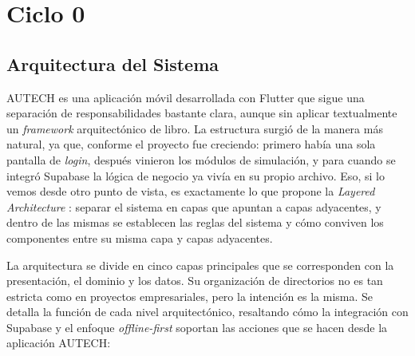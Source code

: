 
\chapter{Ciclo 0}
\label{ch:ciclo0}

\section{Arquitectura del Sistema}
\label{sec:arquitectura}

AUTECH es una aplicación móvil desarrollada con Flutter que sigue una separación de
responsabilidades bastante clara, aunque sin aplicar textualmente un \textit{framework}
arquitectónico de libro. La estructura surgió de la manera más natural, ya que, conforme el
proyecto fue creciendo: primero había una sola pantalla de \textit{login}, después vinieron los
módulos de simulación, y para cuando se integró Supabase la lógica de negocio ya vivía en su
propio archivo. Eso, si lo vemos desde otro punto de vista, es exactamente lo que propone la
\textit{Layered Architecture} \cite{martin2012}: separar el sistema en capas que apuntan a capas
adyacentes, y dentro de las mismas se establecen las reglas del sistema y cómo conviven los
componentes entre su misma capa y capas adyacentes.

La arquitectura se divide en cinco capas principales que se corresponden con la presentación,
el dominio y los datos. Su organización de directorios no es tan estricta como en proyectos
empresariales, pero la intención es la misma. Se detalla la función de cada nivel arquitectónico,
resaltando cómo la integración con Supabase y el enfoque \textit{offline-first} soportan las
acciones que se hacen desde la aplicación AUTECH:

